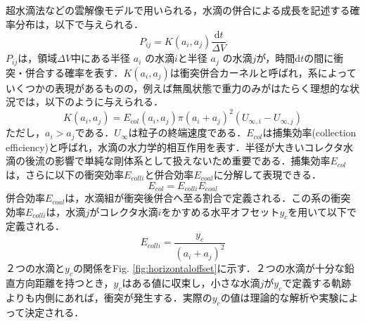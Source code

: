 超水滴法などの雲解像モデルで用いられる，水滴の併合による成長を記述する確率分布は，以下で与えられる\cite{gillespie1972,shima2020}．
\begin{equation}
    \label{intro:collisionprobability}
    P_{ij} = K(a_i, a_j) \frac{\mathrm{d}t}{\Delta V}
\end{equation}
$P_{ij}$は，領域$\Delta V$中にある半径 $a_i$ の水滴$i$と半径 $a_j$ の水滴$j$が，時間$\mathrm{d}t$の間に衝突・併合する確率を表す．$K(a_i,a_j)$は衝突併合カーネルと呼ばれ，系によっていくつかの表現があるものの，例えば無風状態で重力のみがはたらく理想的な状況では，以下のように与えられる\cite{pruppacher1996}．
\begin{equation}
    \label{intro:collisionkernel}
    K(a_i, a_j) = E_{col}(a_i,a_j) \pi (a_i + a_j)^2 \left( U_{\infty,i} - U_{\infty,j} \right)
\end{equation}
ただし，$a_i>a_j$である．$U_{\infty}$は粒子の終端速度である．$E_{col}$は捕集効率(collection efficiency)と呼ばれ，水滴の水力学的相互作用を表す．半径が大きいコレクタ水滴の後流の影響で単純な剛体系として扱えないため重要である．捕集効率$E_{col}$は，さらに以下の衝突効率$E_{colli}$と併合効率$E_{coal}$に分解して表現できる．
\begin{equation}
    \label{intro:collectionefficiency}
    E_{col} = E_{colli} E_{coal}
\end{equation}
併合効率$E_{coal}$は，水滴組が衝突後併合へ至る割合で定義される．この系の衝突効率$E_{colli}$は，水滴$j$がコレクタ水滴$i$をかすめる水平オフセット$y_c$を用いて以下で定義される\cite{pruppacher1996}．
\begin{equation}
    \label{intro:collisionefficiency}
    E_{colli} = \frac{y_c}{\left( a_i + a_j \right) ^ 2}
\end{equation}
２つの水滴と$y_c$の関係をFig. \ref{fig:horizontaloffset}に示す．２つの水滴が十分な鉛直方向距離を持つとき，$y_c$はある値に収束し，小さな水滴$j$が$y_c$で定義する軌跡よりも内側にあれば，衝突が発生する．実際の$y_c$の値は理論的な解析や実験によって決定される．
